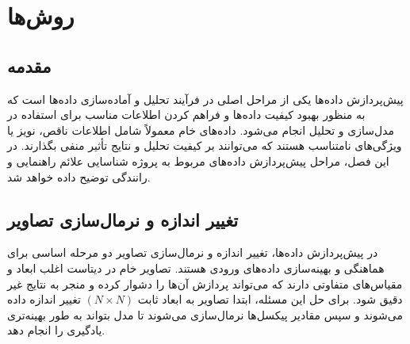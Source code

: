 





\renewcommand{\arraystretch}{0.1} %








\chapter{روش‌ها}

\section{مقدمه}
پیش‌پردازش داده‌ها یکی از مراحل اصلی در فرآیند تحلیل و آماده‌سازی داده‌ها است که به منظور بهبود کیفیت داده‌ها و فراهم کردن اطلاعات مناسب برای استفاده در مدل‌سازی و تحلیل انجام می‌شود. داده‌های خام معمولاً شامل اطلاعات ناقص، نویز یا ویژگی‌های نامتناسب هستند که می‌توانند بر کیفیت تحلیل و نتایج تأثیر منفی بگذارند. در این فصل، مراحل پیش‌پردازش داده‌های مربوط به پروژه شناسایی علائم راهنمایی و رانندگی توضیح داده خواهد شد.

\section{تغییر اندازه و نرمال‌سازی تصاویر}
در پیش‌پردازش داده‌ها، تغییر اندازه و نرمال‌سازی تصاویر دو مرحله اساسی برای هماهنگی و بهینه‌سازی داده‌های ورودی هستند. تصاویر خام در دیتاست اغلب ابعاد و مقیاس‌های متفاوتی دارند که می‌تواند پردازش آن‌ها را دشوار کرده و منجر به نتایج غیر دقیق شود. برای حل این مسئله، ابتدا تصاویر به ابعاد ثابت \(( N \times N )\) تغییر اندازه داده می‌شوند و سپس مقادیر پیکسل‌ها نرمال‌سازی می‌شوند تا مدل بتواند به طور بهینه‌تری یادگیری را انجام دهد.

